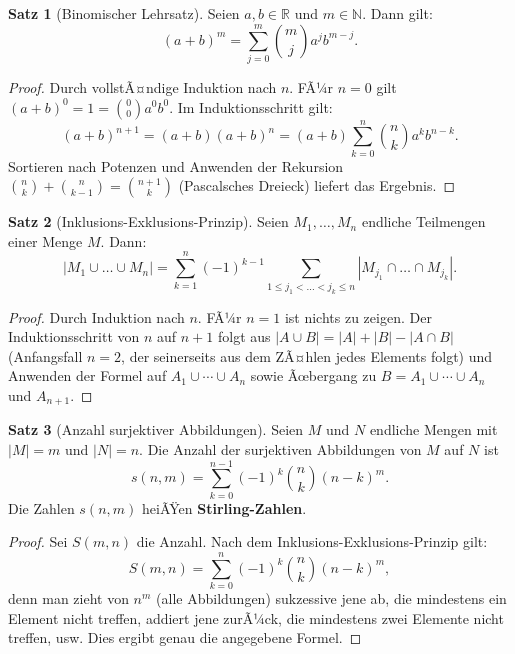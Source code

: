 ﻿\documentclass[a4paper,12pt]{report}
\theoremstyle{definition}
\newtheorem{satz}{Satz}
\begin{document}
\begin{satz}[Binomischer Lehrsatz]
    Seien $a, b \in \mathbb{R}$ und $m \in \mathbb{N}$. Dann gilt:
    \[
        (a + b)^m = \sum_{j=0}^{m} \binom{m}{j} a^j b^{m-j}.
    \]
\end{satz}
\begin{proof}
    Durch vollstÃ¤ndige Induktion nach $n$. FÃ¼r $n = 0$ gilt $(a+b)^0 = 1 = \binom{0}{0}a^0 b^0$.
    Im Induktionsschritt gilt:
    \[
        (a+b)^{n+1} = (a+b)(a+b)^n = (a+b)\sum_{k=0}^n \binom{n}{k} a^k b^{n-k}.
    \]
    Sortieren nach Potenzen und Anwenden der Rekursion
    $\binom{n}{k} + \binom{n}{k-1} = \binom{n+1}{k}$ (Pascalsches Dreieck)
    liefert das Ergebnis.
\end{proof}


\begin{satz}[Inklusions-Exklusions-Prinzip]
    Seien $M_1, \dots, M_n$ endliche Teilmengen einer Menge $M$. Dann:
    \[
        |M_1 \cup \dots \cup M_n|
        = \sum_{k=1}^{n} (-1)^{k-1}
        \sum_{1 \le j_1 < \dots < j_k \le n} |M_{j_1} \cap \dots \cap M_{j_k}|.
    \]
\end{satz}
\begin{proof}
    Durch Induktion nach $n$. FÃ¼r $n = 1$ ist nichts zu zeigen. Der Induktionsschritt
    von $n$ auf $n+1$ folgt aus $|A \cup B| = |A| + |B| - |A \cap B|$ (Anfangsfall $n=2$,
    der seinerseits aus dem ZÃ¤hlen jedes Elements folgt) und Anwenden der Formel
    auf $A_1 \cup \cdots \cup A_n$ sowie Ãœbergang zu $B = A_1 \cup \cdots \cup A_n$
    und $A_{n+1}$.
\end{proof}


\begin{satz}[Anzahl surjektiver Abbildungen]
    Seien $M$ und $N$ endliche Mengen mit $|M| = m$ und $|N| = n$. Die Anzahl
    der surjektiven Abbildungen von $M$ auf $N$ ist
    \[
        s(n, m) = \sum_{k=0}^{n-1} (-1)^k \binom{n}{k} (n-k)^m.
    \]
    Die Zahlen $s(n, m)$ heiÃŸen \textbf{Stirling-Zahlen}.
\end{satz}
\begin{proof}
    Sei $S(m, n)$ die Anzahl. Nach dem Inklusions-Exklusions-Prinzip gilt:
    \[
        S(m, n) = \sum_{k=0}^n (-1)^k \binom{n}{k} (n-k)^m,
    \]
    denn man zieht von $n^m$ (alle Abbildungen) sukzessive jene ab, die mindestens
    ein Element nicht treffen, addiert jene zurÃ¼ck, die mindestens zwei Elemente
    nicht treffen, usw. Dies ergibt genau die angegebene Formel.
\end{proof}
\end{document}
